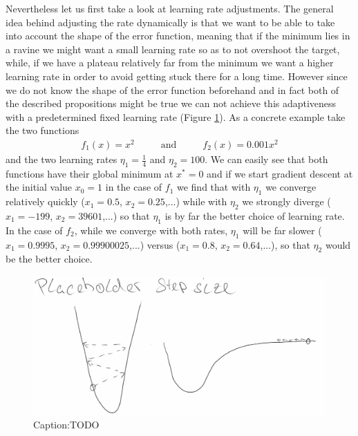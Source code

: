 \documentclass[preprint,12pt,3p]{elsarticle}
\begin{document}
Nevertheless let us first take a look at learning rate adjustments. The general idea behind adjusting the rate dynamically is that we want to be able to take into account the shape of the error function, meaning that if the minimum lies in a ravine we might want a small learning rate so as to not overshoot the target, while, if we have a plateau relatively far from the minimum we want a higher learning rate in order to avoid getting stuck there for a long time. However since we do not know the shape of the error function beforehand and in fact both of the described propositions might be true we can not achieve this adaptiveness with a predetermined fixed learning rate (Figure \ref{fig:learning}). As a concrete example take the two functions 
\begin{align*}
    f_1(x)=x^2 \hspace{1cm}\mbox{ and }\hspace{1cm} f_2(x)=0.001x^2
\end{align*} 
and the two learning rates $\eta_1=\frac{1}{4}$ and $\eta_2=100$. We can easily see that both functions have their global minimum at $x^*=0$ and if we start gradient descent at the initial value $x_0=1$ in the case of $f_1$ we find that with $\eta_1$ we converge relatively quickly ($x_1=0.5$, $x_2=0.25$,...) while with $\eta_2$ we strongly diverge ($x_1=-199$, $x_2=39601$,...) so that $\eta_1$ is by far the better choice of learning rate. In the case of $f_2$, while we converge with both rates, $\eta_1$ will be far slower ($x_1=0.9995$, $x_2=0.99900025$,...) versus ($x_1=0.8$, $x_2=0.64$,...), so that $\eta_2$ would be the better choice. 

\begin{figure}
    \centering
    \includegraphics[scale=0.4]{figures/learning.jpg}
    \caption{Caption:TODO}
    \label{fig:learning}
\end{figure}
\end{document}
